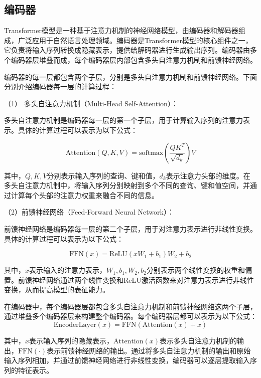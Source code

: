 \subsection{编码器}
Transformer模型是一种基于注意力机制的神经网络模型，由编码器和解码器组成，广泛应用于自然语言处理领域。编码器是Transformer模型的核心组件之一，它负责将输入序列转换成隐藏表示，提供给解码器进行生成输出序列。编码器由多个编码器层堆叠而成，每个编码器层内部包含多头自注意力机制和前馈神经网络。

编码器的每一层都包含两个子层，分别是多头自注意力机制和前馈神经网络。下面分别介绍编码器每一层的计算过程：

（1） 多头自注意力机制（Multi-Head Self-Attention）：

多头自注意力机制是编码器每一层的第一个子层，用于计算输入序列的注意力表示。具体的计算过程可以表示为以下公式：

\begin{equation}
	\text{Attention}(Q, K, V) = \text{softmax}\left(\frac{QK^T}{\sqrt{d_k}}\right)V
\end{equation}

其中，$Q, K, V$分别表示输入序列的查询、键和值，$d_k$表示注意力头部的维度。在多头自注意力机制中，将输入序列分别映射到多个不同的查询、键和值空间，并通过计算每个头部的注意力权重来融合不同的信息。

（2）前馈神经网络（Feed-Forward Neural Network）：

前馈神经网络是编码器每一层的第二个子层，用于对注意力表示进行非线性变换。具体的计算过程可以表示为以下公式：

\begin{equation}
	\text{FFN}(x) = \text{ReLU}(xW_1 + b_1)W_2 + b_2
\end{equation}


其中，$x$表示输入的注意力表示，$W_1, b_1, W_2, b_2$分别表示两个线性变换的权重和偏置。前馈神经网络通过两个线性变换和ReLU激活函数来对注意力表示进行非线性变换，从而提高模型的表征能力。

在编码器中，每个编码器层都包含多头自注意力机制和前馈神经网络这两个子层，通过堆叠多个编码器层来构建整个编码器。每个编码器层都可以表示为以下公式：
\begin{equation}
	\text{EncoderLayer}(x) = \text{FFN}(\text{Attention}(x) + x)
\end{equation}

其中，$x$表示输入序列的隐藏表示，$\text{Attention}(x)$表示多头自注意力机制的输出，$\text{FFN}(\cdot)$表示前馈神经网络的输出。通过将多头自注意力机制的输出和原始输入序列相加，并通过前馈神经网络进行非线性变换，编码器可以逐层提取输入序列的特征表示。

